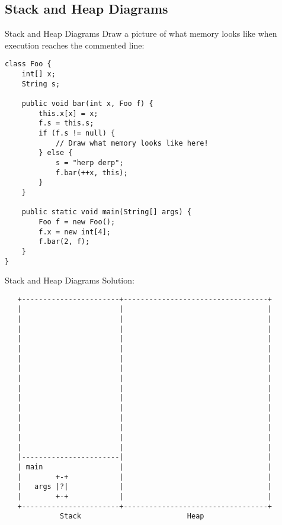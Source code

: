 \documentclass[9pt]{beamer}
\begin{document}
\subsection{Stack and Heap Diagrams}
\begin{frame}[fragile]{Stack and Heap Diagrams}
  Draw a picture of what memory looks like when execution reaches the
  commented line:

  \begin{lstlisting}[basicstyle=\footnotesize]
class Foo {
    int[] x;
    String s;

    public void bar(int x, Foo f) {
        this.x[x] = x;
        f.s = this.s;
        if (f.s != null) {
            // Draw what memory looks like here!
        } else {
            s = "herp derp";
            f.bar(++x, this);
        }
    }

    public static void main(String[] args) {
        Foo f = new Foo();
        f.x = new int[4];
        f.bar(2, f);
    }
}
  \end{lstlisting}

\end{frame}

\begin{frame}[fragile]{Stack and Heap Diagrams}
  Solution:

  {\footnotesize
  \begin{verbatim}
   +-----------------------+----------------------------------+
   |                       |                                  |
   |                       |                                  |
   |                       |                                  |
   |                       |                                  |
   |                       |                                  |
   |                       |                                  |
   |                       |                                  |
   |                       |                                  |
   |                       |                                  |
   |                       |                                  |
   |                       |                                  |
   |                       |                                  |
   |                       |                                  |
   |                       |                                  |
   |                       |                                  |
   |-----------------------|                                  |
   | main                  |                                  |
   |        +-+            |                                  |
   |   args |?|            |                                  |
   |        +-+            |                                  |
   +-----------------------+----------------------------------+
             Stack                         Heap
  \end{verbatim}
  }
\end{frame}
\end{document}
